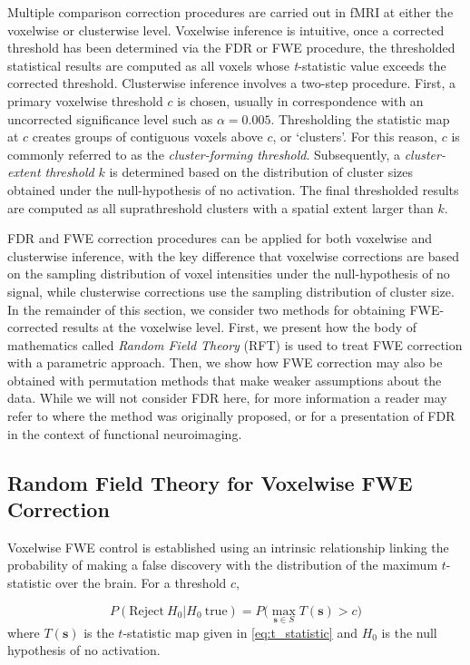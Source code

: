 Multiple comparison correction procedures are carried out in fMRI at either the voxelwise or clusterwise level. Voxelwise inference is intuitive, once a corrected threshold has been determined via the FDR or FWE procedure, the thresholded statistical results are computed as all voxels whose \textit{t}-statistic value exceeds the corrected threshold. Clusterwise inference involves a two-step procedure. First, a primary voxelwise threshold $c$ is chosen, usually in correspondence with an uncorrected significance level such as $\alpha = 0.005$. Thresholding the statistic map at $c$ creates groups of contiguous voxels above $c$, or `clusters'. For this reason, $c$ is commonly referred to as the \textit{cluster-forming threshold}. Subsequently, a \textit{cluster-extent threshold} $k$ is determined based on the distribution of cluster sizes obtained under the null-hypothesis of no activation. The final thresholded results are computed as all suprathreshold clusters with a spatial extent larger than $k$. 

FDR and FWE correction procedures can be applied for both voxelwise and clusterwise inference, with the key difference that voxelwise corrections are based on the sampling distribution of voxel intensities under the null-hypothesis of no signal, while clusterwise corrections use the sampling distribution of cluster size. In the remainder of this section, we consider two methods for obtaining FWE-corrected results at the voxelwise level. First, we present how the body of mathematics called \textit{Random Field Theory} (RFT) is used to treat FWE correction with a parametric approach. Then, we show how FWE correction may also be obtained with permutation methods that make weaker assumptions about the data. While we will not consider FDR here, for more information a reader may refer to \citet*{Benjamini1995-yy} where the method was originally proposed, or \citet*{Genovese2002-xm} for a presentation of FDR in the context of functional neuroimaging. 

\subsection{Random Field Theory for Voxelwise FWE Correction}

Voxelwise FWE control is established using an intrinsic relationship linking the probability of making a false discovery with the distribution of the maximum $t$-statistic over the brain. For a threshold $c$,

\begin{equation}
\label{eq:FWE_and_global_maximum}
P(\text{Reject} \ H_{0} | H_{0} \ \text{true}) = P\Big(\max\limits_{\bm{s} \in S} T(\bm{s}) > c \Big)
\end{equation}
where $T(\bm{s})$ is the $t$-statistic map given in \ref{eq:t_statistic} and $H_{0}$ is the null hypothesis of no activation.

